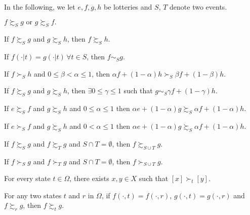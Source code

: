 In the following, we let $e, f, g, h$ be lotteries and $S$, $T$ denote two events.

\begin{axiom}[Completeness]
$f \succsim_S g \text{ or } g \succsim_S f.$
\label{ch1axcompleteness}
\end{axiom}
\begin{axiom}[Transitivity]
If $f \succsim_S g$ and $g \succsim_S h$, then $f \succsim_S h$.
\label{ch1:ax:trans}
\end{axiom}
\begin{axiom}[Relevance]
If $f(\cdot | t) = g(\cdot | t) \, \forall t \in S$, then $f \sim_S g$.
\label{ch1:ax:rel}
\end{axiom}
\begin{axiom}[Monotonicity]
If $f \succ_S h$ and $0 \leq \beta < \alpha \leq 1$, then $\alpha f + (1-\alpha) h \succ_S \beta f + (1-\beta) h$.
\label{ch1:ax:mono}
\end{axiom}
\begin{axiom}[Continuity]
If $f \succsim_S g$ and $g \succsim_S h$, then $\exists 0 \leq \gamma \leq 1$ such that $g \sim_S \gamma f + (1-\gamma) h$.
\label{ch1:ax:conti}
\end{axiom}
\begin{axiom}
If $e \succsim_S f$ and $g \succsim_S h$ and $ 0 \leq \alpha \leq 1$ then $\alpha e + (1-\alpha) g \succsim_S \alpha f + (1-\alpha) h.$
\label{ch1:ax:objsub}
\end{axiom}
\begin{axiom}
If $e \succ_S f$ and $g \succsim_S h$ and $ 0 < \alpha \leq 1$ then $\alpha e + (1-\alpha) g \succsim_S \alpha f + (1-\alpha) h.$
\label{ch1:ax:sobjsub}
\end{axiom}
\begin{axiom}
If $f \succsim_S g$ and $f \succsim_T g$ and $S \cap T = \emptyset$, then $f \succsim_{S \cup T} g$.
\label{ch1:ax:subsub}
\end{axiom}
\begin{axiom}
If $f \succ_S g$ and $f \succ_T g$ and $S \cap T = \emptyset$, then $f \succ_{S \cup T} g$.
\label{ch1:ax:ssubsub}
\end{axiom}
\begin{axiom}[Interest]
For every state $t \in \Omega$, there exists $x, y \in X$ such that $[x] \succ_t [y]$.
\label{ch1axint}
\end{axiom}

\begin{axiom}
For any two states $t$ and $r$ in $\Omega$, if $f(\cdot, t) = f(\cdot, r) $, $g(\cdot, t) = g(\cdot, r) $ and $f \succsim_r g$, then $f \succsim_t g$.
\label{ch1:ax:sn}
\end{axiom}

